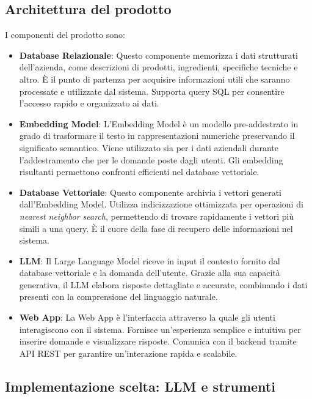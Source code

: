 \subsection{Architettura del prodotto}
I componenti del prodotto sono:
\begin{itemize}
    \item \textbf{Database Relazionale}:  
    Questo componente memorizza i dati strutturati dell’azienda, come descrizioni di prodotti, ingredienti, specifiche tecniche e altro. È il punto di partenza per acquisire informazioni utili che saranno processate e utilizzate dal sistema. Supporta query SQL per consentire l'accesso rapido e organizzato ai dati.
    
    \item \textbf{Embedding Model}:  
    L’Embedding Model è un modello pre-addestrato in grado di trasformare il testo in rappresentazioni numeriche preservando il significato semantico. Viene utilizzato sia per i dati aziendali durante l’addestramento che per le domande poste dagli utenti. Gli embedding risultanti permettono confronti efficienti nel database vettoriale.
    
    \item \textbf{Database Vettoriale}:  
    Questo componente archivia i vettori generati dall’Embedding Model. Utilizza indicizzazione ottimizzata per operazioni di \textit{nearest neighbor search}, permettendo di trovare rapidamente i vettori più simili a una query. È il cuore della fase di recupero delle informazioni nel sistema.
    
    \item \textbf{LLM}:  
    Il Large Language Model riceve in input il contesto fornito dal database vettoriale e la domanda dell’utente. Grazie alla sua capacità generativa, il LLM elabora risposte dettagliate e accurate, combinando i dati presenti con la comprensione del linguaggio naturale.
    
    \item \textbf{Web App}:  
    La Web App è l’interfaccia attraverso la quale gli utenti interagiscono con il sistema. Fornisce un’esperienza semplice e intuitiva per inserire domande e visualizzare risposte. Comunica con il backend tramite API REST per garantire un'interazione rapida e scalabile.
\end{itemize}

\subsection{Implementazione scelta: LLM e strumenti}
